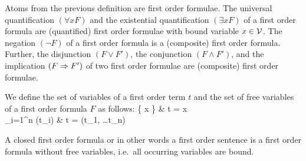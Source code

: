
\begin{definition}\label{def:syntax:FOF}
	Atoms from the previous definition are {\myem first order formulae}.  
	The universal quantification $(\forall x F)$ 
	and the existential quantification $(\exists x F)$ 
	of a first order formula are (quantified) first order formulae
	with {\myem bound} variable $x\in{\mathcal V}$.
	The negation $(\lnot F)$ of a first order formula
	is a (composite) first order formula.
	Further, the disjunction $(F \lor F')$, 
	the conjunction $(F \land F') $, 
	and the implication $(F \Rightarrow F')$ 
	of two first order formulae
	are (composite) first order formulae.
\end{definition}

\begin{definition}\label{def:term:vars}\label{def:fof:fvars}\label{def:fof:sentence}
	We define the set of variables of a first order term $t$ and the set of {\myem free} variables of a first order formula $F$ as follows:
 {
		\{ x \} &  t = x \in \mcV \\
		\bigcup_{i=1}^n \var(t_i) &   t = \mf(t_1, \ldots t_n)
	}
\end{definition}

\begin{definition}\label{def:fof:closed}
	A closed first order formula or in other words
	a first order {\myem sentence} 
	is a first order formula without free variables,
	i.e.~all occurring variables are bound.
\end{definition}

